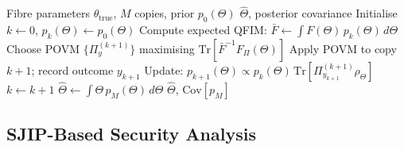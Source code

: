 \documentclass[journal,twocolumn]{IEEEtran}
\theoremstyle{definition}
\theoremstyle{plain}
\newcommand{\Tr}{\mathrm{Tr}}
\begin{document}
\begin{algorithm}[t]
\caption{Adaptive Bayesian Channel Parameter Estimation}
\label{alg:estimation}
\begin{algorithmic}[1]
\Require Fibre parameters $\theta_{\mathrm{true}}$,\; $M$ copies,\;
         prior $p_0(\Theta)$
\Ensure $\hat\Theta$, posterior covariance
\State Initialise $k \leftarrow 0$,\; $p_k(\Theta) \leftarrow p_0(\Theta)$
  \State Compute expected QFIM:
         $\bar F \leftarrow \int F(\Theta)\,p_k(\Theta)\,d\Theta$
  \State Choose POVM $\{\Pi_y^{(k+1)}\}$ maximising
         $\Tr[\bar F^{-1} F_\Pi(\Theta)]$
  \State Apply POVM to copy $k+1$; record outcome $y_{k+1}$
  \State Update: $p_{k+1}(\Theta) \propto
         p_k(\Theta)\,\Tr[\Pi_{y_{k+1}}^{(k+1)} \rho_\Theta]$
  \State $k \leftarrow k + 1$
\EndWhile
\State $\hat\Theta \leftarrow \int\Theta\,p_M(\Theta)\,d\Theta$
\Return $\hat\Theta$,\; $\mathrm{Cov}[p_M]$
\end{algorithmic}
\end{algorithm}

\subsection{SJIP-Based Security Analysis}
\end{document}

